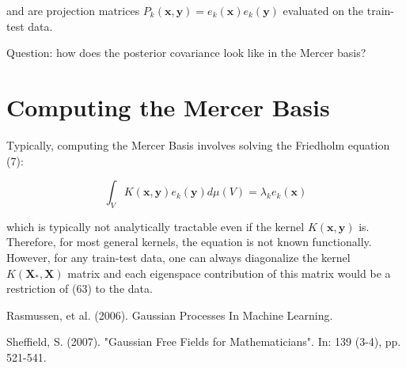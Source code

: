 \documentclass[11pt]{article}
\theoremstyle{plain} %
\theoremstyle{remark}
\begin{document}
and are projection matrices $P_{k}(\mathbf{x}, \mathbf{y})=e_{k}(\mathbf{x})
e_{k}(\mathbf{y})$ evaluated on the train-test data.

Question: how does the posterior covariance look like in the Mercer basis?

\section*{Computing the Mercer Basis}
Typically, computing the Mercer Basis involves solving the Friedholm equation
(7):

$$
\int_{V} K(\mathbf{x}, \mathbf{y}) e_{k}(\mathbf{y}) d \mu(V)=\lambda_{k} e_{k}(\mathbf{x})
$$

which is typically not analytically tractable even if the kernel $K(\mathbf{x},
\mathbf{y})$ is. Therefore, for most general kernels, the equation is not known
functionally. However, for any train-test data, one can always diagonalize the
kernel $K\left(\mathbf{X}_{*}, \mathbf{X}\right)$ matrix and each eigenspace
contribution of this matrix would be a restriction of (63) to the data.

\begin{thebibliography}{2}
  Rasmussen, et al. (2006). Gaussian Processes In Machine Learning.

  Sheffield, S. (2007). "Gaussian Free Fields for Mathematicians". In: 139 (3-4), pp. 521-541.
\end{thebibliography}
\end{document}
